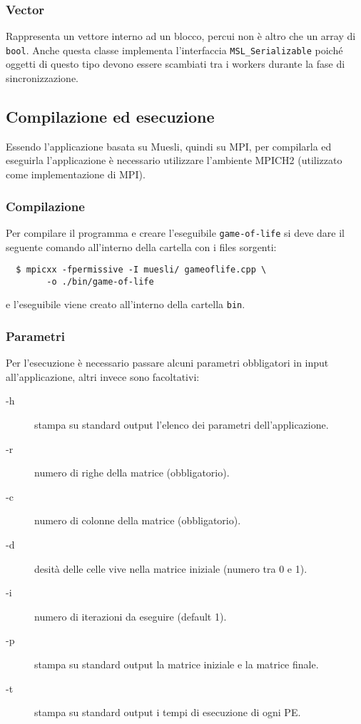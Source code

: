 \subsubsection*{Vector}
Rappresenta un vettore interno ad un blocco, percui non \`e altro che un array di \texttt{bool}. Anche questa classe implementa l'interfaccia \texttt{MSL\_Serializable} poich\'e oggetti di questo tipo devono essere scambiati tra i workers durante la fase di sincronizzazione.

\subsection{Compilazione ed esecuzione}
Essendo l'applicazione basata su Muesli, quindi su MPI, per compilarla ed eseguirla l'applicazione \`e necessario utilizzare l'ambiente MPICH2 \cite{bib:ref5} (utilizzato come implementazione di MPI).

\subsubsection*{Compilazione}
Per compilare il programma e creare l'eseguibile \texttt{game-of-life} si deve dare il seguente comando all'interno della cartella con i files sorgenti:
\begin{verbatim}
  $ mpicxx -fpermissive -I muesli/ gameoflife.cpp \
        -o ./bin/game-of-life
\end{verbatim}
e l'eseguibile viene creato all'interno della cartella \texttt{bin}.

\subsubsection*{Parametri}
Per l'esecuzione \`e necessario passare alcuni parametri obbligatori in input all'applicazione, altri invece sono facoltativi:
\begin{description}
  \item[-h] stampa su standard output l'elenco dei parametri dell'applicazione.
  \item[-r] numero di righe della matrice (obbligatorio).
  \item[-c] numero di colonne della matrice (obbligatorio).
  \item[-d] desit\`a delle celle vive nella matrice iniziale (numero tra 0 e 1).
  \item[-i] numero di iterazioni da eseguire (default 1).
  \item[-p] stampa su standard output la matrice iniziale e la matrice finale.
  \item[-t] stampa su standard output i tempi di esecuzione di ogni PE.
\end{description}

